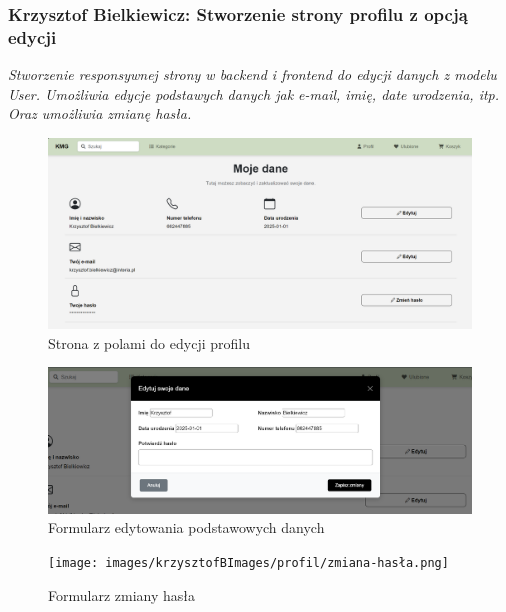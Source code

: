 \documentclass[12pt,a4paper,oneside]{article}
\theoremstyle{definition}
\numberwithin{equation}{section}
\begin{document}
\subsubsection{Krzysztof Bielkiewicz: Stworzenie strony profilu z opcją edycji}
\label{1.3.6}
\textit{Stworzenie responsywnej strony w backend i frontend do edycji danych z modelu User.
Umożliwia edycje podstawych danych jak e-mail, imię, date urodzenia, itp.
Oraz umożliwia zmianę hasła.}

\begin{figure}[H]
    \centering
    \includegraphics[width=0.9\columnwidth]{images/krzysztofBImages/profil/strona-edycji-profilu.png}
    \caption{Strona z polami do edycji profilu}
\end{figure}

\begin{figure}[H]
    \centering
    \includegraphics[width=0.9\columnwidth]{images/krzysztofBImages/profil/edycja-danych.png}
    \caption{Formularz edytowania podstawowych danych}
\end{figure}

\begin{figure}[H]
    \centering
    \texttt{[image: images/krzysztofBImages/profil/zmiana-hasła.png]}
    \caption{Formularz zmiany hasła}
\end{figure}
\end{document}
